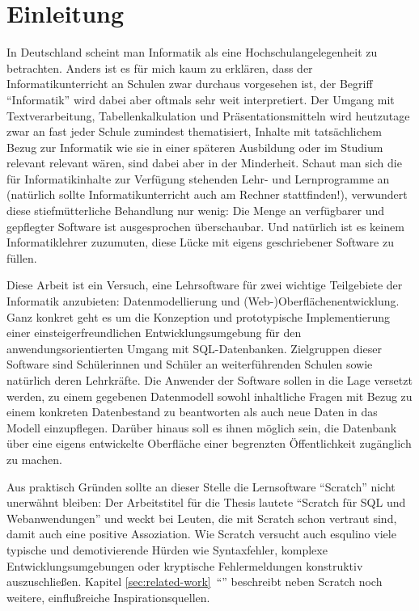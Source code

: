 \section{Einleitung}

In Deutschland scheint man Informatik als eine Hochschulangelegenheit zu betrachten. Anders ist es für mich kaum zu erklären, dass der Informatikunterricht an Schulen zwar durchaus vorgesehen ist, der Begriff ``Informatik'' wird dabei aber oftmals sehr weit interpretiert. Der Umgang mit Textverarbeitung, Tabellenkalkulation und Präsentationsmitteln wird heutzutage zwar an fast jeder Schule zumindest thematisiert, Inhalte mit tatsächlichem Bezug zur Informatik wie sie in einer späteren Ausbildung oder im Studium relevant relevant wären, sind dabei aber in der Minderheit. Schaut man sich die für Informatikinhalte zur Verfügung stehenden Lehr- und Lernprogramme an (natürlich sollte Informatikunterricht auch am Rechner stattfinden!), verwundert diese stiefmütterliche Behandlung nur wenig: Die Menge an verfügbarer und gepflegter Software ist ausgesprochen überschaubar. Und natürlich ist es keinem Informatiklehrer zuzumuten, diese Lücke mit eigens geschriebener Software zu füllen.

Diese Arbeit ist ein Versuch, eine Lehrsoftware für zwei wichtige Teilgebiete der Informatik anzubieten: Datenmodellierung und (Web-)Oberflächenentwicklung. Ganz konkret geht es um die Konzeption und prototypische Implementierung einer einsteigerfreundlichen Entwicklungsumgebung für den anwendungsorientierten Umgang mit SQL-Datenbanken. Zielgruppen dieser Software sind Schülerinnen und Schüler an weiterführenden Schulen sowie natürlich deren Lehrkräfte. Die Anwender der Software sollen in die Lage versetzt werden, zu einem gegebenen Datenmodell sowohl inhaltliche Fragen mit Bezug zu einem konkreten Datenbestand zu beantworten als auch neue Daten in das Modell einzupflegen. Darüber hinaus soll es ihnen möglich sein, die Datenbank über eine eigens entwickelte Oberfläche einer begrenzten Öffentlichkeit zugänglich zu machen.

Aus praktisch Gründen sollte an dieser Stelle die Lernsoftware "`Scratch"' nicht unerwähnt bleiben: Der Arbeitstitel für die Thesis lautete "`Scratch für SQL und Webanwendungen"' und weckt bei Leuten, die mit Scratch schon vertraut sind, damit auch eine positive Assoziation. Wie Scratch versucht auch esqulino viele typische und demotivierende Hürden wie Syntaxfehler, komplexe Entwicklungsumgebungen oder kryptische Fehlermeldungen konstruktiv auszuschließen. Kapitel \ref{sec:related-work}~"`"' beschreibt neben Scratch noch weitere, einflußreiche Inspirationsquellen.

